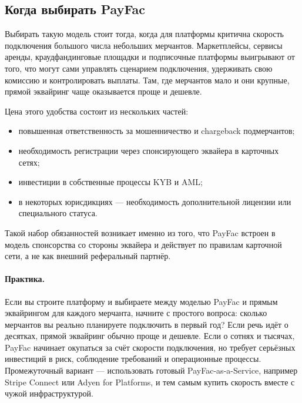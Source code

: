 \subsection*{Когда выбирать PayFac}

Выбирать такую модель стоит тогда, когда для платформы критична
скорость подключения большого числа небольших мерчантов.
Маркетплейсы, сервисы аренды, краудфандинговые площадки
и подписочные платформы выигрывают от того, что могут сами
управлять сценарием подключения, удерживать свою комиссию
и контролировать выплаты. Там, где мерчантов мало и они крупные,
прямой эквайринг чаще оказывается проще и дешевле.

Цена этого удобства состоит из нескольких частей:
\begin{itemize}
  \item повышенная ответственность за мошенничество и chargeback
        подмерчантов;
  \item необходимость регистрации через спонсирующего эквайера
        в карточных сетях;
  \item инвестиции в собственные процессы KYB и AML;
  \item в некоторых юрисдикциях --- необходимость дополнительной
        лицензии или специального статуса.
\end{itemize}

Такой набор обязанностей возникает именно из того, что PayFac
встроен в модель спонсорства со стороны эквайера и действует
по правилам карточной сети, а не как внешний реферальный
партнёр.\cite{visa-acceptance-entities,visa-payment-facilitator-marketplace-risk-guide}

\paragraph{Практика.}
  Если вы строите платформу и выбираете между моделью PayFac
  и прямым эквайрингом для каждого мерчанта, начните
  с простого вопроса: сколько мерчантов вы реально планируете
  подключить в первый год? Если речь идёт о десятках,
  прямой эквайринг обычно проще и дешевле. Если о сотнях
  и тысячах, PayFac начинает окупаться за счёт скорости
  подключения, но требует серьёзных инвестиций в риск,
  соблюдение требований и операционные процессы.
  Промежуточный вариант ---
  использовать готовый PayFac-as-a-Service, например
  Stripe Connect или Adyen for Platforms, и тем самым купить
  скорость вместе с чужой инфраструктурой.


